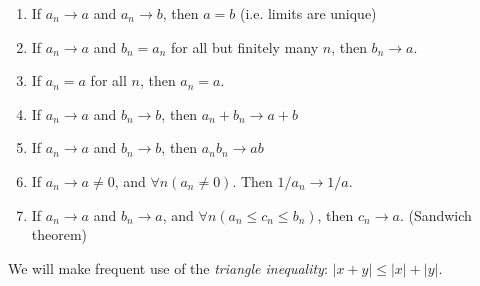 \documentclass[a4paper]{article}
\begin{document}
  \begin{thm}\leavevmode
    \begin{enumerate}
      \item If $a_n\to a$ and $a_n\to b$, then $a = b$ (i.e. limits are unique)
      \item If $a_n \to a$ and $b_n = a_n$ for all but finitely many $n$, then $b_n \to a$.
      \item If $a_n = a$ for all $n$, then $a_n = a$.
      \item If $a_n\to a$ and $b_n\to b$, then $a_n + b_n \to a+ b$
      \item If $a_n\to a$ and $b_n \to b$, then $a_nb_n\to ab$
      \item If $a_n\to a\not= 0$, and $\forall n(a_n \not= 0)$. Then $1/a_n \to 1/a$.
      \item If $a_n \to a$ and $b_n \to a$, and $\forall n(a_n\leq c_n\leq b_n)$, then $c_n \to a$. (Sandwich theorem)
    \end{enumerate}
  \end{thm}
  \note We will make frequent use of the \emph{triangle inequality}: $|x + y|\leq |x| + |y|$.
\end{document}
